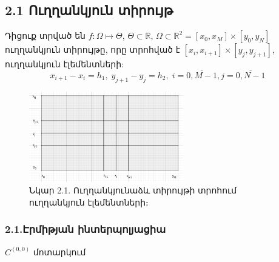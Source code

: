 \documentclass[fleqn, bachelor,subf,12pt,notitlepage]{article}
\begin{document}
\subsection*{2.1 Ուղղանկյուն տիրույթ}
Դիցուք տրված են $f:\Omega\mapsto \Theta$,  $\Theta \subset \mathbb{R}$, $\Omega \subset \mathbb{R}^{2} = \left[x_{0}, x_{M}\right] \times \left[y_{0}, y_{N}\right]$  ուղղանկյուն տիրույթը, որը տրոհված է $\left[x_{i}, x_{i+1}\right] \times \left[y_{j}, y_{j+1}\right]$, ուղղանկյուն էլեմենտների:
$$x_{i+1}-x_{i}=h_{1}, \; y_{j+1}-y_{j}=h_{2}, \; i=\overline{0, M-1}, j=\overline{0, N-1}$$
\begin{figure}[h!]
\centering
\includegraphics[width=0.6\textwidth]{images/two_var_linear}
\captionsetup{labelformat=empty}
\caption{\hfill Նկար 2.1. Ուղղանկյունաձև տիրույթի տրոհում ուղղանկյուն էլեմենտների։}
\end{figure}
\subsubsection*{2.1.Էրմիթյան ինտերպոլյացիա}
$C^{(0,0)}$ մոտարկում
\end{document}
